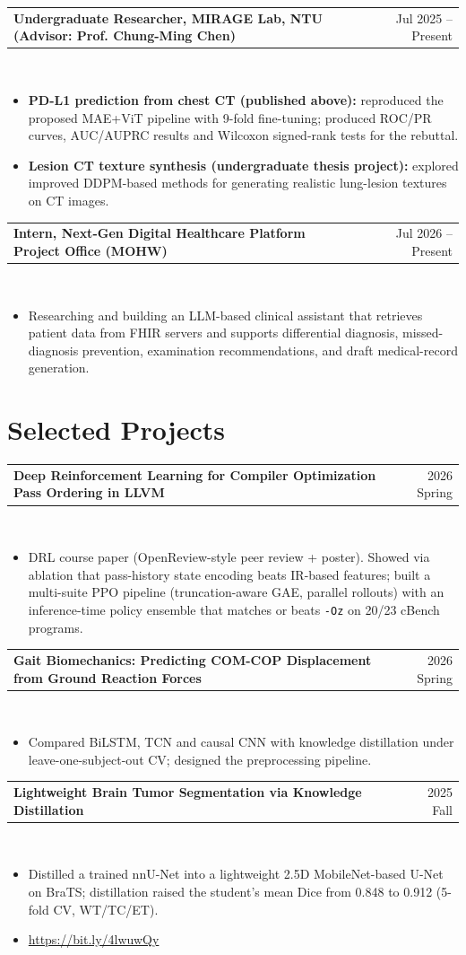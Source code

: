 \documentclass[10pt]{article}
\makeatletter
\newcommand{\entry}[2]{\par\vspace{3pt}\begin{tabularx}{\textwidth}{@{}>{\raggedright\arraybackslash}X r@{}}\textbf{#1} & #2\end{tabularx}\\[-9pt]}
\makeatother
\begin{document}
\entry{Undergraduate Researcher, MIRAGE Lab, NTU \textmd{(Advisor: Prof. Chung-Ming Chen)}}{Jul 2025 -- Present}
\begin{itemize}
    \item \textbf{PD-L1 prediction from chest CT (published above):} reproduced the proposed MAE+ViT pipeline with 9-fold fine-tuning;
        produced ROC/PR curves, AUC/AUPRC results and Wilcoxon signed-rank tests for the rebuttal.
    \item \textbf{Lesion CT texture synthesis (undergraduate thesis project):} explored improved DDPM-based methods
        for generating realistic lung-lesion textures on CT images.
\end{itemize}

\entry{Intern, Next-Gen Digital Healthcare Platform Project Office (MOHW)}{Jul 2026 -- Present}
\begin{itemize}
  \item Researching and building an LLM-based clinical assistant that retrieves patient data from FHIR servers and supports
        differential diagnosis, missed-diagnosis prevention, examination recommendations, and draft medical-record generation.
\end{itemize}
\section*{Selected Projects}

\entry{Deep Reinforcement Learning for Compiler Optimization Pass Ordering in LLVM}{2026 Spring}
\begin{itemize}
  \item DRL course paper (OpenReview-style peer review + poster). Showed via ablation that pass-history state encoding beats IR-based
        features; built a multi-suite PPO pipeline (truncation-aware GAE, parallel rollouts) with an inference-time policy ensemble
        that matches or beats \texttt{-Oz} on 20/23 cBench programs.
\end{itemize}

\entry{Gait Biomechanics: Predicting COM-COP Displacement from Ground Reaction Forces}{2026 Spring}
\begin{itemize}
  \item Compared BiLSTM, TCN and causal CNN with knowledge distillation under leave-one-subject-out CV; designed the preprocessing pipeline.
\end{itemize}

\entry{Lightweight Brain Tumor Segmentation via Knowledge Distillation}{2025 Fall}
\begin{itemize}
    \item Distilled a trained nnU-Net into a lightweight 2.5D MobileNet-based U-Net on BraTS; distillation raised the student's
        mean Dice from 0.848 to 0.912 (5-fold CV, WT/TC/ET).
    \item \href{https://bit.ly/4lwuwQy}{https://bit.ly/4lwuwQy}
\end{itemize}
\end{document}
